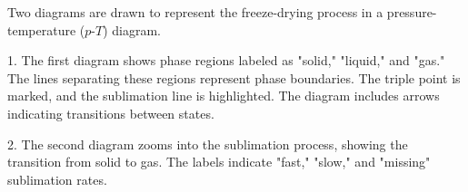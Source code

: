Two diagrams are drawn to represent the freeze-drying process in a pressure-temperature (\(p\)-\(T\)) diagram.  

1. The first diagram shows phase regions labeled as "solid," "liquid," and "gas." The lines separating these regions represent phase boundaries. The triple point is marked, and the sublimation line is highlighted. The diagram includes arrows indicating transitions between states.  

2. The second diagram zooms into the sublimation process, showing the transition from solid to gas. The labels indicate "fast," "slow," and "missing" sublimation rates.